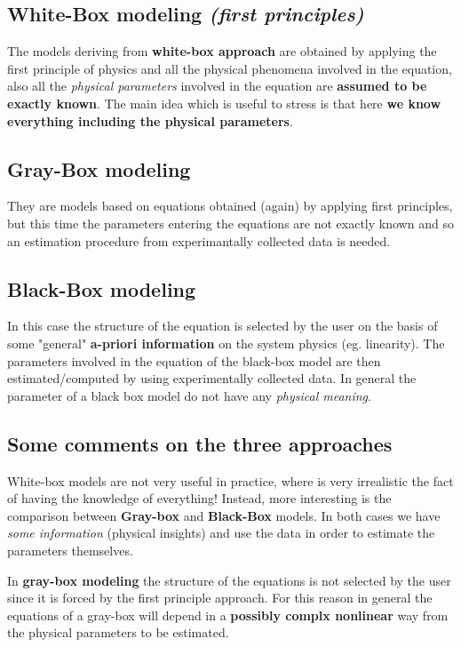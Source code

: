 \subsection{White-Box modeling \textit{(first principles)}} The models deriving from \textbf{white-box approach} are obtained by applying the first principle of physics and all the physical phenomena involved in the equation, also all the \textit{physical parameters} involved in the equation are \textbf{assumed to be exactly known}. The main idea which is useful to stress is that here \textbf{we know everything including the physical parameters}. 

\subsection{Gray-Box modeling}
They are models based on equations obtained (again) by applying first principles, but this time the parameters entering the equations are not exactly known and so an estimation procedure from experimantally collected data is needed. 

\subsection{Black-Box modeling}
In this case the structure of the equation is selected by the user on the basis of some "general" \textbf{a-priori information} on the system physics (eg. linearity). The parameters involved in the equation of the black-box model are then estimated/computed by using experimentally collected data. In general the parameter of a black box model do not have any \textit{physical meaning}.

\subsection{Some comments on the three approaches}
White-box models are not very useful in practice, where is very irrealistic the fact of having the knowledge of everything! Instead, more interesting is the comparison between \textbf{Gray-box} and \textbf{Black-Box} models. In both cases we have \textit{some information} (physical insights) and use the data in order to estimate the parameters themselves.

In \textbf{gray-box modeling} the structure of the equations is not selected by the user since it is forced by the first principle approach. For this reason in general the equations of a gray-box will depend in a \textbf{possibly complx nonlinear} way from the physical parameters to be estimated.

